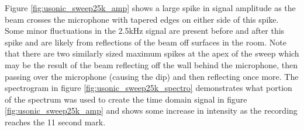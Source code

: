 \newpage
Figure \ref{fig:usonic_sweep25k_amp} shows a large spike in signal amplitude as the beam crosses the microphone with tapered edges on either side of this spike. Some minor fluctuations in the 2.5kHz signal are present before and after this spike and are likely from reflections of the beam off surfaces in the room. Note that there are two similarly sized maximum spikes at the apex of the sweep which may be the result of the beam reflecting off the wall behind the microphone, then passing over the microphone (causing the dip) and then reflecting once more. The spectrogram in figure \ref{fig:usonic_sweep25k_spectro} demonstrates what portion of the spectrum was used to create the time domain signal in figure \ref{fig:usonic_sweep25k_amp} and shows some increase in intensity as the recording reaches the 11 second mark.


